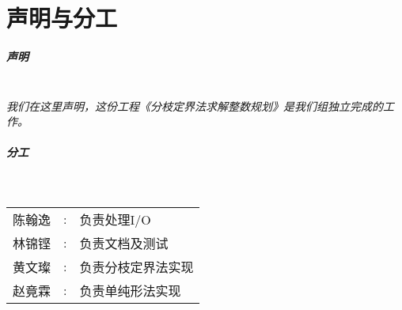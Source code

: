 \chapter{声明与分工}
	\paragraph{声明} ~\\
	
	\textit{我们在这里声明，这份工程《分枝定界法求解整数规划》是我们组独立完成的工作。}
	\vspace{20pt}
	\paragraph{分工} ~\\
	
	\begin{tabular}{l l l}
		陈翰逸 &:& 负责处理I/O\\
		林锦铿 &:& 负责文档及测试\\
		黄文璨 &:& 负责分枝定界法实现\\
		赵竟霖 &:& 负责单纯形法实现\\
	\end{tabular}
